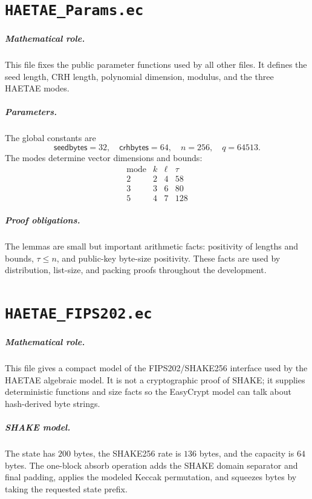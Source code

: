 \documentclass[11pt]{report}
\newcommand{\ecchapter}[2]{\chapter{\texorpdfstring{\texttt{#1}}{#2}}}
\theoremstyle{definition}
\theoremstyle{plain}
\theoremstyle{definition}
\begin{document}


\ecchapter{HAETAE\_Params.ec}{HAETAE Params.ec}

\paragraph{Mathematical role.}
This file fixes the public parameter functions used by all other files.  It
defines the seed length, CRH length, polynomial dimension, modulus, and the
three HAETAE modes.

\paragraph{Parameters.}
The global constants are
\[
  \mathsf{seedbytes}=32,\quad
  \mathsf{crhbytes}=64,\quad
  n=256,\quad
  q=64513.
\]
The modes determine vector dimensions and bounds:
\[
\begin{array}{c|ccc}
\text{mode} & k & \ell & \tau\\
\hline
2 & 2 & 4 & 58\\
3 & 3 & 6 & 80\\
5 & 4 & 7 & 128
\end{array}
\]

\paragraph{Proof obligations.}
The lemmas are small but important arithmetic facts: positivity of lengths and
bounds, \(\tau\le n\), and public-key byte-size positivity.  These facts are
used by distribution, list-size, and packing proofs throughout the development.



\ecchapter{HAETAE\_FIPS202.ec}{HAETAE FIPS202.ec}

\paragraph{Mathematical role.}
This file gives a compact model of the FIPS202/SHAKE256 interface used by the
HAETAE algebraic model.  It is not a cryptographic proof of SHAKE; it supplies
deterministic functions and size facts so the EasyCrypt model can talk about
hash-derived byte strings.

\paragraph{SHAKE model.}
The state has \(200\) bytes, the SHAKE256 rate is \(136\) bytes, and the
capacity is \(64\) bytes.  The one-block absorb operation adds the SHAKE domain
separator and final padding, applies the modeled Keccak permutation, and
squeezes bytes by taking the requested state prefix.
\end{document}
